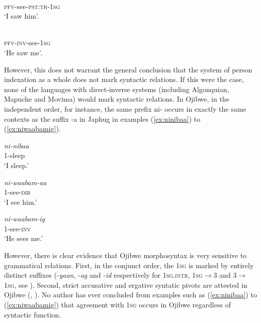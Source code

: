 \documentclass[oldfontcommands,oneside,a4paper,11pt]{article}
\newcommand{\ipa}[1]{{\phon \mbox{#1}}} %
\begin{document}
\begin{exe}
\ex \label{ex:pWmtota}
\gll \ipa{pɯ-mto-t-a} \\
\textsc{pfv}-see-\textsc{pst:tr}-\textsc{1sg} \\
\glt `I saw him'.
\end{exe}

\begin{exe}
\ex \label{ex:pWwGmtoa}
\gll \ipa{pɯ́-wɣ-mto-a} \\
\textsc{pfv}-\textsc{inv}-see-\textsc{1sg} \\
\glt `He saw me'.
\end{exe}

However, this does not warrant the general conclusion that  the system of person indexation as a whole does not mark syntactic relations. If this were the case, none of the languages with direct-inverse systems  (including Algonquian, Mapuche and Movima) would mark syntactic relations. In Ojibwe, in the independent order, for instance, the same prefix \ipa{ni-} occurs in exactly the same contexts as the suffix \ipa{-a} in Japhug in examples (\ref{ex:ninibaa}) to (\ref{ex:niwaabamig}). 

\begin{exe}
\ex  \label{ex:ninibaa}
\gll \textit{ni-nibaa} \\
1-sleep  \\
\glt `I sleep.'
\end{exe} 

\begin{exe}
\ex  \label{ex:niwaabamaa}
\gll \textit{ni-waabam-aa} \\
1-see-\textsc{dir} \\
\glt `I see him.'
\end{exe} 

\begin{exe}
\ex   \label{ex:niwaabamig}
\gll \textit{ni-waabam-ig} \\
1-see-\textsc{inv} \\
\glt `He sees me.'
\end{exe} 
 
However, there is clear evidence that Ojibwe morphosyntax is very sensitive to grammatical relations. First, in the conjunct order, the \textsc{1sg} is marked by entirely distinct suffixes (-\textit{yaan}, -\textit{ag} and -\textit{id} respectively for \textsc{1sg.intr}, \textsc{1sg}$\rightarrow$3 and  3$\rightarrow$\textsc{1sg}, see \citealt[295]{valentine01grammar}). Second, strict accusative and ergative syntatic pivots are attested in Ojibwe (\citealt{rhodes94valency}, \citealt[119-126]{zuniga06}). No author has ever concluded from examples such as (\ref{ex:ninibaa}) to (\ref{ex:niwaabamig}) that agreement with \textsc{1sg} occurs in Ojibwe  regardless of syntactic function.
\end{document}
